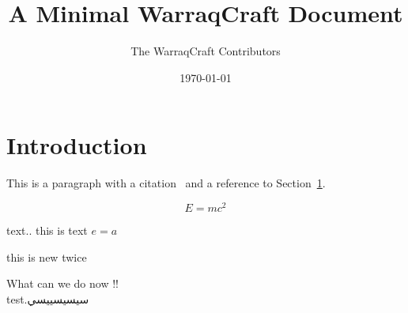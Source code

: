 \documentclass[12pt]{article}
\title{A Minimal WarraqCraft Document}
\author{The WarraqCraft Contributors}
\date{\today}
\begin{document}
\maketitle

\section{Introduction}\label{sec:intro}
This is a paragraph with a citation~\cite{knuth84} and a reference to
Section~\ref{sec:intro}.

\begin{equation}
  E = mc^2 \label{eq:einstein}
\end{equation}

\newpage

text.. this is text
$ e = a $
\newpage 

this is new  \cite{lamport94}
twice 
\newpage 

What can we do now !!\\
test.سيسيسييسي



\cite{lamport94}
\end{document}
